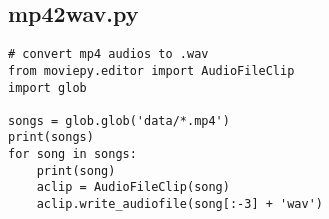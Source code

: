 \documentclass[12pt, a4paper]{article}
\begin{document}
\subsection{mp42wav.py}
\begin{verbatim}
# convert mp4 audios to .wav
from moviepy.editor import AudioFileClip
import glob

songs = glob.glob('data/*.mp4')
print(songs)
for song in songs:
    print(song)
    aclip = AudioFileClip(song)
    aclip.write_audiofile(song[:-3] + 'wav')
\end{verbatim}
\end{document}

